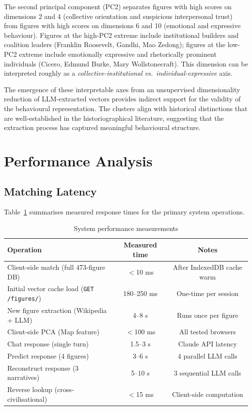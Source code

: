 \documentclass[11pt, a4paper]{report}
\begin{document}
The second principal component (PC2) separates figures with high scores on dimensions 2 and 4 (collective orientation and suspicious interpersonal trust) from figures with high scores on dimensions 6 and 10 (emotional and expressive behaviour). Figures at the high-PC2 extreme include institutional builders and coalition leaders (Franklin Roosevelt, Gandhi, Mao Zedong); figures at the low-PC2 extreme include emotionally expressive and rhetorically prominent individuals (Cicero, Edmund Burke, Mary Wollstonecraft). This dimension can be interpreted roughly as a \textit{collective-institutional vs.\ individual-expressive} axis.

The emergence of these interpretable axes from an unsupervised dimensionality reduction of LLM-extracted vectors provides indirect support for the validity of the behavioural representation. The clusters align with historical distinctions that are well-established in the historiographical literature, suggesting that the extraction process has captured meaningful behavioural structure.

\section{Performance Analysis}

\subsection{Matching Latency}

Table~\ref{tab:perf} summarises measured response times for the primary system operations.

\begin{table}[H]
  \centering
  \caption{System performance measurements}
  \label{tab:perf}
  \begin{tabular}{p{5cm}cc}
    \toprule
    Operation & Measured time & Notes \\
    \midrule
    Client-side match (full 473-figure DB) & $<$10 ms & After IndexedDB cache warm \\
    Initial vector cache load (\texttt{GET /figures/}) & 180--250 ms & One-time per session \\
    New figure extraction (Wikipedia + LLM) & 4--8 s & Runs once per figure \\
    Client-side PCA (Map feature) & $<$100 ms & All tested browsers \\
    Chat response (single turn) & 1.5--3 s & Claude API latency \\
    Predict response (4 figures) & 3--6 s & 4 parallel LLM calls \\
    Reconstruct response (3 narratives) & 5--10 s & 3 sequential LLM calls \\
    Reverse lookup (cross-civilisational) & $<$15 ms & Client-side computation \\
    \bottomrule
  \end{tabular}
\end{table}
\end{document}
